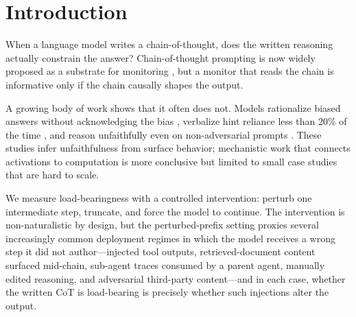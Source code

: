 \documentclass[10pt]{article} %
\begin{document}
\begin{abstract}
This gradient creates a structural problem for CoT-based monitoring: on easy tasks the model ignores its own reasoning, so the trace carries no signal; on hard tasks the model follows corrupted steps, so errors propagate before any monitor can intervene. Linear probes over hidden states distinguish the three behavioral modes (silent bypass, self-correction, error propagation), but additive activation steering along the same directions mostly fails to flip behavioral type. Single-direction steering produces a null, and a multi-direction extension on a probe-derived 8-vector basis partially controls Type C ($\sim$$25\%$ of Type C examples flipped at the strongest setting) but leaves most cases unmoved. Behavioral type is readable, but not reliably controllable under the additive interventions we tested.
\end{abstract}

\section{Introduction}
\label{sec:intro}

When a language model writes a chain-of-thought, does the written reasoning actually constrain the answer? Chain-of-thought prompting \citep{wei2022chain, kojima2022} is now widely proposed as a substrate for monitoring \citep{baker2025, korbak2025}, but a monitor that reads the chain is informative only if the chain causally shapes the output.

A growing body of work shows that it often does not. Models rationalize biased answers without acknowledging the bias \citep{turpin2023}, verbalize hint reliance less than $20\%$ of the time \citep{chen2025a}, and reason unfaithfully even on non-adversarial prompts \citep{arcuschin2025}. These studies infer unfaithfulness from surface behavior; mechanistic work that connects activations to computation \citep{lindsey2025, ameisen2025} is more conclusive but limited to small case studies that are hard to scale.

We measure load-bearingness with a controlled intervention: perturb one intermediate step, truncate, and force the model to continue. The intervention is non-naturalistic by design, but the perturbed-prefix setting proxies several increasingly common deployment regimes in which the model receives a wrong step it did not author---injected tool outputs, retrieved-document content surfaced mid-chain, sub-agent traces consumed by a parent agent, manually edited reasoning, and adversarial third-party content---and in each case, whether the written CoT is load-bearing is precisely whether such injections alter the output.
\end{document}
